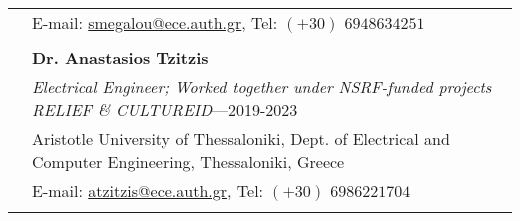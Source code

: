 \documentclass[a4paper,10pt,twoside]{article}
\begin{document}
\begin{tabular}{rp{14cm}}
& E-mail: \href{mailto: smegalou@ece.auth.gr}{smegalou@ece.auth.gr}, Tel: $(+30)$ $694 863 4251$ \\
&\\
& \textbf{Dr. Anastasios Tzitzis} \\
& \textit{Electrical Engineer; Worked together under NSRF-funded projects RELIEF \& CULTUREID}---2019-2023\\
&Aristotle University of Thessaloniki, Dept. of Electrical and Computer Engineering, Thessaloniki, Greece \\
& E-mail: \href{mailto: atzitzis@ece.auth.gr}{atzitzis@ece.auth.gr}, Tel: $(+30)$ $698 622 1704$ \\
&\\

\end{tabular}
\end{document}
